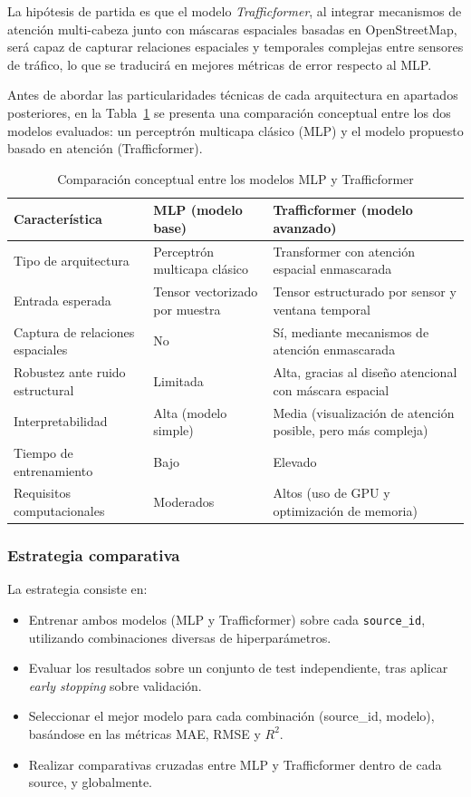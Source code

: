 La hipótesis de partida es que el modelo \textit{Trafficformer}, al integrar mecanismos de atención multi-cabeza junto con máscaras espaciales basadas en OpenStreetMap, será capaz de capturar relaciones espaciales y temporales complejas entre sensores de tráfico, lo que se traducirá en mejores métricas de error respecto al MLP.

Antes de abordar las particularidades técnicas de cada arquitectura en apartados posteriores, en la Tabla~\ref{tab:mlp_vs_trafficformer} se presenta una comparación conceptual entre los dos modelos evaluados: un perceptrón multicapa clásico (MLP) y el modelo propuesto basado en atención (Trafficformer).

\begin{table}[H]
	\centering
	\caption{Comparación conceptual entre los modelos MLP y Trafficformer}
	\label{tab:mlp_vs_trafficformer}
	\begin{tabularx}{\textwidth}{lXX}
		\toprule
		\textbf{Característica} & \textbf{MLP (modelo base)} & \textbf{Trafficformer (modelo avanzado)} \\
		\midrule
		Tipo de arquitectura & Perceptrón multicapa clásico & Transformer con atención espacial enmascarada \\
		Entrada esperada & Tensor vectorizado por muestra & Tensor estructurado por sensor y ventana temporal \\
		Captura de relaciones espaciales & No & Sí, mediante mecanismos de atención enmascarada \\
		Robustez ante ruido estructural & Limitada & Alta, gracias al diseño atencional con máscara espacial \\
		Interpretabilidad & Alta (modelo simple) & Media (visualización de atención posible, pero más compleja) \\
		Tiempo de entrenamiento & Bajo & Elevado \\
		Requisitos computacionales & Moderados & Altos (uso de GPU y optimización de memoria) \\
		\bottomrule
	\end{tabularx}
\end{table}

\subsubsection*{Estrategia comparativa}

La estrategia consiste en:

\begin{itemize}
	\item Entrenar ambos modelos (MLP y Trafficformer) sobre cada \texttt{source\_id}, utilizando combinaciones diversas de hiperparámetros.
	\item Evaluar los resultados sobre un conjunto de test independiente, tras aplicar \textit{early stopping} sobre validación.
	\item Seleccionar el mejor modelo para cada combinación (source\_id, modelo), basándose en las métricas MAE, RMSE y $R^2$.
	\item Realizar comparativas cruzadas entre MLP y Trafficformer dentro de cada source, y globalmente.
\end{itemize}

